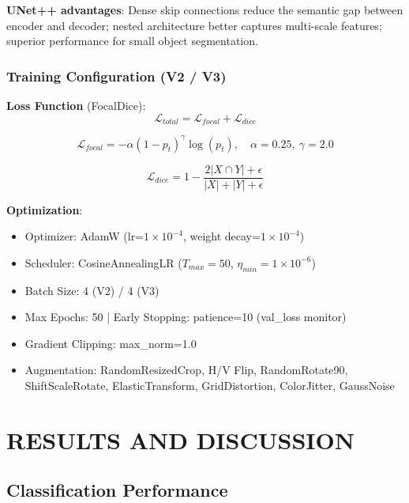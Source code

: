 \documentclass[10pt,a4paper]{article}
\begin{document}
\textbf{UNet++ advantages}: Dense skip connections reduce the semantic gap between encoder and decoder; nested architecture better captures multi-scale features; superior performance for small object segmentation.

\subsubsection{Training Configuration (V2 / V3)}

\textbf{Loss Function} (FocalDice):
\begin{equation}
\mathcal{L}_{total} = \mathcal{L}_{focal} + \mathcal{L}_{dice}
\end{equation}

\begin{equation}
\mathcal{L}_{focal} = -\alpha(1-p_t)^\gamma \log(p_t), \quad \alpha=0.25,\ \gamma=2.0
\end{equation}

\begin{equation}
\mathcal{L}_{dice} = 1 - \frac{2|X \cap Y| + \epsilon}{|X| + |Y| + \epsilon}
\end{equation}

\textbf{Optimization}:
\begin{itemize}
\item Optimizer: AdamW \cite{loshchilov2019decoupled} (lr=$1 \times 10^{-4}$, weight decay=$1 \times 10^{-4}$)
\item Scheduler: CosineAnnealingLR ($T_{max}=50$, $\eta_{min}=1 \times 10^{-6}$)
\item Batch Size: 4 (V2) / 4 (V3)
\item Max Epochs: 50 | Early Stopping: patience=10 (val\_loss monitor)
\item Gradient Clipping: max\_norm=1.0
\item Augmentation: RandomResizedCrop, H/V Flip, RandomRotate90, ShiftScaleRotate, ElasticTransform, GridDistortion, ColorJitter, GaussNoise \cite{buslaev2020albumentations}
\end{itemize}

\section{RESULTS AND DISCUSSION}

\subsection{Classification Performance}
\end{document}
